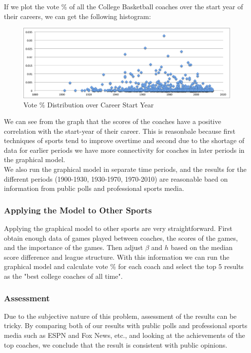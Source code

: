 \documentclass[titlepage,11pt]{article}
\begin{document}
If we plot the vote \% of all the College Basketball coaches over the start year of their careers, we can get the following histogram:

\begin{figure}[H]
      \caption{Vote \% Distribution over Career Start Year}
      \centering
      \includegraphics[width=1\textwidth]{graphs/time_horizon.png}
 \end{figure}

\noindent We can see from the graph that the scores of the coaches have a positive correlation with the start-year of their career. This is reasonbale because first techniques of sports tend to improve overtime and second due to the shortage of data for earlier periods we have more connectivity for coaches in later periods in the graphical model.
\\

\noindent We also run the graphical model in separate time periods, and the results for the different periods (1900-1930, 1930-1970, 1970-2010) are reasonable baed on information from public polls and professional sports media.

\subsubsection*{Applying the Model to Other Sports}

Applying the graphical model to other sports are very straightforward. First obtain enough data of games played between coaches, the scores of the games, and the importance of the games. Then adjust $\beta$ and $h$ based on the median score difference and league structure. With this information we can run the graphical model and calculate vote \% for each coach and select the top 5 results as the "best college coaches of all time".

\subsubsection*{Assessment}

\noindent Due to the subjective nature of this problem, assessment of the results can be tricky. By comparing both of our results with public polls and professional sports media such as ESPN and Fox News, etc., and looking at the achievements of the top coaches, we conclude that the result is consistent with public opinions.
\end{document}
